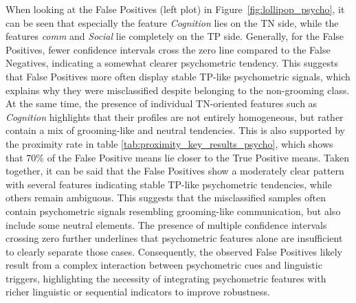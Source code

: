 When looking at the False Positives (left plot) in Figure~\ref{fig:lollipop_psycho}, it can be seen that especially the feature \textit{Cognition} lies on the TN side, while the features \textit{comm} and \textit{Social} lie completely on the TP side. Generally, for the False Positives, fewer confidence intervals cross the zero line compared to the False Negatives, indicating a somewhat clearer psychometric tendency. This suggests that False Positives more often display stable TP-like psychometric signals, which explains why they were misclassified despite belonging to the non-grooming class. At the same time, the presence of individual TN-oriented features such as \textit{Cognition} highlights that their profiles are not entirely homogeneous, but rather contain a mix of grooming-like and neutral tendencies. This is also supported by the proximity rate in table \ref{tab:proximity_key_results_psycho}, which shows that $70\%$ of the False Positive means lie closer to the True Positive means. Taken together, it can be said that the False Positives show a moderately clear pattern with several features indicating stable TP-like psychometric tendencies, while others remain ambiguous. This suggests that the misclassified samples often contain psychometric signals resembling grooming-like communication, but also include some neutral elements. The presence of multiple confidence intervals crossing zero further underlines that psychometric features alone are insufficient to clearly separate those cases. Consequently, the observed False Positives likely result from a complex interaction between psychometric cues and linguistic triggers, highlighting the necessity of integrating psychometric features with richer linguistic or sequential indicators to improve robustness.


